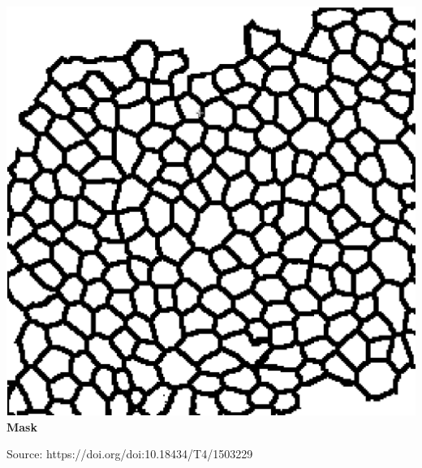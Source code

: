 \begin{frame}
\begin{minipage}[h!]{0.40\textwidth}
    \centering
    \includegraphics[scale=0.12]{./img/3_benchmark/mask.png}
    \textbf{Mask}
  \end{minipage}

  \bigskip

  Source: https://doi.org/doi:10.18434/T4/1503229

\end{frame}

\def\slidetitle{Accuracy for 'cell boundary'}

